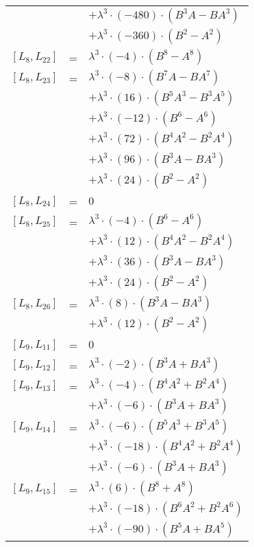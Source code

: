 \documentclass{article}
\begin{document}
\begin{center}
\begin{longtable}{lll}
 & & $ + {\lambda}^3{\cdot}(-480){\cdot}(B^{3}A-BA^{3})$ \\*
 & & $ + {\lambda}^3{\cdot}(-360){\cdot}(B^{2}-A^{2})$ \\
$[L_{8},L_{22}]$ & = & ${\lambda}^3{\cdot}(-4){\cdot}(B^{8}-A^{8})$ \\
$[L_{8},L_{23}]$ & = & ${\lambda}^3{\cdot}(-8){\cdot}(B^{7}A-BA^{7})$ \\*
 & & $ + {\lambda}^3{\cdot}(16){\cdot}(B^{5}A^{3}-B^{3}A^{5})$ \\*
 & & $ + {\lambda}^3{\cdot}(-12){\cdot}(B^{6}-A^{6})$ \\*
 & & $ + {\lambda}^3{\cdot}(72){\cdot}(B^{4}A^{2}-B^{2}A^{4})$ \\*
 & & $ + {\lambda}^3{\cdot}(96){\cdot}(B^{3}A-BA^{3})$ \\*
 & & $ + {\lambda}^3{\cdot}(24){\cdot}(B^{2}-A^{2})$ \\
$[L_{8},L_{24}]$ & = & $ 0 $ \\
$[L_{8},L_{25}]$ & = & ${\lambda}^3{\cdot}(-4){\cdot}(B^{6}-A^{6})$ \\*
 & & $ + {\lambda}^3{\cdot}(12){\cdot}(B^{4}A^{2}-B^{2}A^{4})$ \\*
 & & $ + {\lambda}^3{\cdot}(36){\cdot}(B^{3}A-BA^{3})$ \\*
 & & $ + {\lambda}^3{\cdot}(24){\cdot}(B^{2}-A^{2})$ \\
$[L_{8},L_{26}]$ & = & ${\lambda}^3{\cdot}(8){\cdot}(B^{3}A-BA^{3})$ \\*
 & & $ + {\lambda}^3{\cdot}(12){\cdot}(B^{2}-A^{2})$ \\
$[L_{9},L_{11}]$ & = & $ 0 $ \\
$[L_{9},L_{12}]$ & = & ${\lambda}^3{\cdot}(-2){\cdot}(B^{3}A+BA^{3})$ \\
$[L_{9},L_{13}]$ & = & ${\lambda}^3{\cdot}(-4){\cdot}(B^{4}A^{2}+B^{2}A^{4})$ \\*
 & & $ + {\lambda}^3{\cdot}(-6){\cdot}(B^{3}A+BA^{3})$ \\
$[L_{9},L_{14}]$ & = & ${\lambda}^3{\cdot}(-6){\cdot}(B^{5}A^{3}+B^{3}A^{5})$ \\*
 & & $ + {\lambda}^3{\cdot}(-18){\cdot}(B^{4}A^{2}+B^{2}A^{4})$ \\*
 & & $ + {\lambda}^3{\cdot}(-6){\cdot}(B^{3}A+BA^{3})$ \\
$[L_{9},L_{15}]$ & = & ${\lambda}^3{\cdot}(6){\cdot}(B^{8}+A^{8})$ \\*
 & & $ + {\lambda}^3{\cdot}(-18){\cdot}(B^{6}A^{2}+B^{2}A^{6})$ \\*
 & & $ + {\lambda}^3{\cdot}(-90){\cdot}(B^{5}A+BA^{5})$ \\*

\end{longtable}
\end{center}
\end{document}
